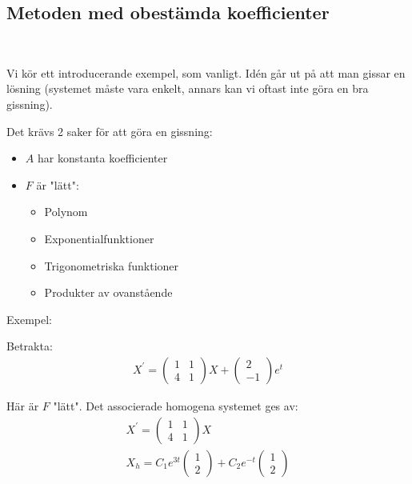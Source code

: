 \subsection{Metoden med obestämda koefficienter}\hfill\\
\par\bigskip
Vi kör ett introducerande exempel, som vanligt. Idén går ut på att man gissar en lösning (systemet måste vara enkelt, annars kan vi oftast inte göra en bra gissning).\par
\noindent Det krävs 2 saker för att göra en gissning:
\begin{itemize}
  \item $A$ har konstanta koefficienter
  \item $F$ är "lätt":
    \begin{itemize}
      \item Polynom
      \item Exponentialfunktioner
      \item Trigonometriska funktioner
      \item Produkter av ovanstående
    \end{itemize}
\end{itemize}
\par\bigskip
\noindent Exempel:\par
\noindent Betrakta:
\begin{equation*}
  \begin{gathered}
    X^{\prime} = \begin{pmatrix}1&1\\4&1\end{pmatrix}X+\begin{pmatrix}2\\-1\end{pmatrix}e^t
  \end{gathered}
\end{equation*}\par
\noindent Här är $F$ "lätt". Det associerade homogena systemet ges av:
\begin{equation*}
  \begin{gathered}
    X^{\prime} = \begin{pmatrix}1&1\\4&1\end{pmatrix}X\\
    X_h = C_1e^{3t}\begin{pmatrix}1\\2\end{pmatrix}+C_2e^{-t}\begin{pmatrix}1\\2\end{pmatrix}
  \end{gathered}
\end{equation*}
